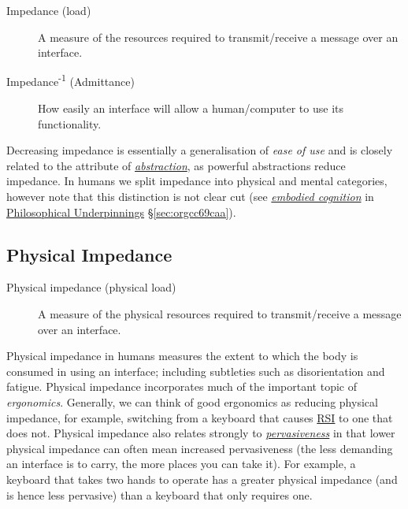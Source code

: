 \documentclass[logo,bsc,singlespacing,parskip]{infthesis}
\begin{document}
\begin{mdframed}
\begin{description}
\item[{Impedance\label{impedance} (load)}] A measure of the resources required to transmit/receive a message over an interface.

\item[{Impedance\textsuperscript{-1} (Admittance)}] How easily an interface will allow a human/computer to use its functionality.
\end{description}
\end{mdframed}

Decreasing impedance is essentially a generalisation of \emph{ease of use} and is closely related to the attribute of \emph{\hyperref[abstraction]{abstraction}}, as powerful abstractions reduce impedance.
In humans we split impedance into physical and mental categories, however note that this distinction is not clear cut (see \emph{\hyperref[orgcc8d0dd]{embodied cognition}} in \hyperref[sec:orgcc69caa]{Philosophical Underpinnings} \S \ref{sec:orgcc69caa}).
\subsection{Physical Impedance}
\label{sec:orgd6cd2c4}
\medskip
\begin{mdframed}
\begin{description}
\item[{Physical impedance\label{physical impedance} (physical load)}] A measure of the physical resources required to transmit/receive a message over an interface.
\end{description}
\end{mdframed}

Physical impedance in humans measures the extent to which the body is consumed in using an interface; including subtleties such as disorientation and fatigue.
Physical impedance incorporates much of the important topic of \emph{ergonomics}.
Generally, we can think of good ergonomics as reducing physical impedance, for example, switching from a keyboard that causes \hyperref[orgdb95c62]{RSI} to one that does not.
Physical impedance also relates strongly to \emph{\hyperref[pervasiveness]{pervasiveness}} in that lower physical impedance can often mean increased pervasiveness (the less demanding an interface is to carry, the more places you can take it).
For example, a keyboard that takes two hands to operate has a greater physical impedance (and is hence less pervasive) than a keyboard that only requires one.
\end{document}
